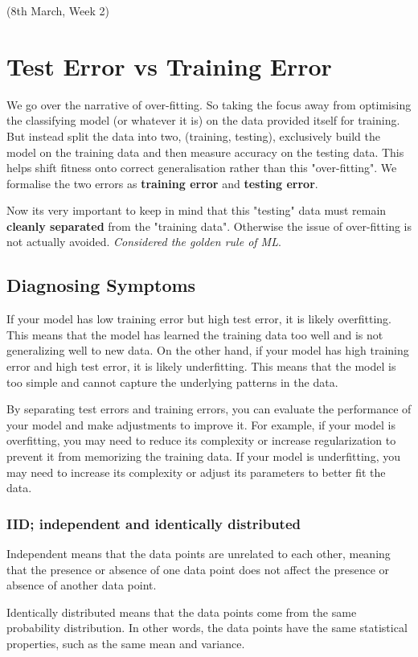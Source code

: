 \documentclass{article}
\begin{document}
(8th March, Week 2)
\section*{Test Error vs Training Error}
We go over the narrative of over-fitting. So taking the focus away from optimising the classifying model (or whatever it is) on the data provided itself for training. But instead split the data into two, (training, testing), exclusively build the model on the training data and then measure accuracy on the testing data. This helps shift fitness onto correct generalisation rather than this "over-fitting". We formalise the two errors as {\bf training error} and {\bf testing error}.

Now its very important to keep in mind that this "testing" data must remain {\bf cleanly separated} from the "training data". Otherwise the issue of over-fitting is not actually avoided. {\em Considered the golden rule of ML}.

\subsection*{Diagnosing Symptoms}

If your model has low training error but high test error, it is likely overfitting. This means that the model has learned the training data too well and is not generalizing well to new data. On the other hand, if your model has high training error and high test error, it is likely underfitting. This means that the model is too simple and cannot capture the underlying patterns in the data.

By separating test errors and training errors, you can evaluate the performance of your model and make adjustments to improve it. For example, if your model is overfitting, you may need to reduce its complexity or increase regularization to prevent it from memorizing the training data. If your model is underfitting, you may need to increase its complexity or adjust its parameters to better fit the data.

\subsubsection*{IID; independent and identically distributed}
Independent means that the data points are unrelated to each other, meaning that the presence or absence of one data point does not affect the presence or absence of another data point.

Identically distributed means that the data points come from the same probability distribution. In other words, the data points have the same statistical properties, such as the same mean and variance.
\end{document}
